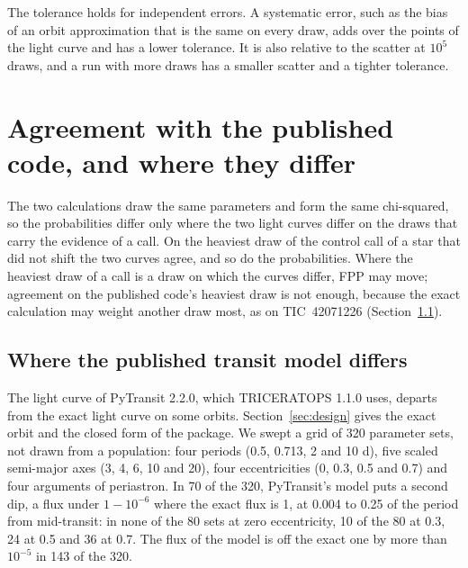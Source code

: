 \documentclass[11pt]{article}
\begin{document}
The tolerance holds for independent errors. A systematic error, such as the bias of an orbit approximation that is the same on every draw, adds over the points of the light curve and has a lower tolerance. It is also relative to the scatter at $10^{5}$ draws, and a run with more draws has a smaller scatter and a tighter tolerance.


\section{Agreement with the published code, and where they differ}\label{sec:agreement}

The two calculations draw the same parameters and form the same chi-squared, so the probabilities differ only where the two light curves differ on the draws that carry the evidence of a call. On the heaviest draw of the control call of a star that did not shift the two curves agree, and so do the probabilities. Where the heaviest draw of a call is a draw on which the curves differ, FPP may move; agreement on the published code's heaviest draw is not enough, because the exact calculation may weight another draw most, as on TIC~42071226 (Section~\ref{sec:model}).

\subsection{Where the published transit model differs}\label{sec:model}

The light curve of PyTransit 2.2.0, which TRICERATOPS 1.1.0 uses, departs from the exact light curve on some orbits. Section~\ref{sec:design} gives the exact orbit and the closed form of the package. We swept a grid of 320 parameter sets, not drawn from a population: four periods (0.5, 0.713, 2 and 10 d), five scaled semi-major axes (3, 4, 6, 10 and 20), four eccentricities (0, 0.3, 0.5 and 0.7) and four arguments of periastron. In 70 of the 320, PyTransit's model puts a second dip, a flux under $1-10^{-6}$ where the exact flux is 1, at 0.004 to 0.25 of the period from mid-transit: in none of the 80 sets at zero eccentricity, 10 of the 80 at 0.3, 24 at 0.5 and 36 at 0.7. The flux of the model is off the exact one by more than $10^{-5}$ in 143 of the 320.
\end{document}
